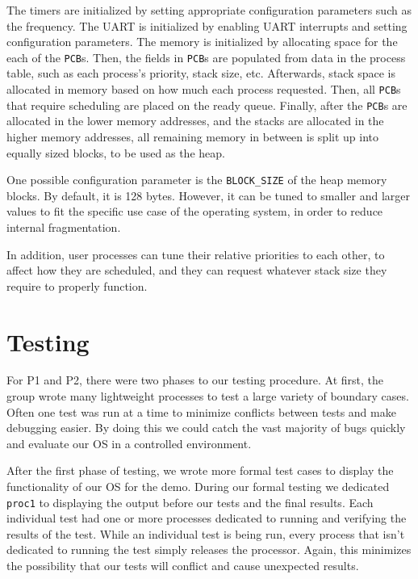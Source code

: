 \documentclass[12pt]{report}
\begin{document}
The timers are initialized by setting appropriate configuration parameters such as the frequency. The UART is initialized by enabling UART interrupts and setting configuration parameters.
The memory is initialized by allocating space for the each of the \texttt{PCB}s. Then, the fields in \texttt{PCB}s are populated from data in the process table, such as each process's priority, stack size, etc. Afterwards, stack space is allocated in memory based on how much each process requested. Then, all \texttt{PCB}s that require scheduling are placed on the ready queue. Finally, after the \texttt{PCB}s are allocated in the lower memory addresses, and the stacks are allocated in the higher memory addresses, all remaining memory in between is split up into equally sized blocks, to be used as the heap. 

One possible configuration parameter is the \texttt{BLOCK_SIZE} of the heap memory blocks. By default, it is 128 bytes. However, it can be tuned to smaller and larger values to fit the specific use case of the operating system, in order to reduce internal fragmentation.

In addition, user processes can tune their relative priorities to each other, to affect how they are scheduled, and they can request whatever stack size they require to properly function.

\section{Testing}

For P1 and P2, there were two phases to our testing procedure.  At first, the group wrote many lightweight processes to test a large variety of boundary cases.  Often one test was run at a time to minimize conflicts between tests and make debugging easier.  By doing this we could catch the vast majority of bugs quickly and evaluate our OS in a controlled environment.

After the first phase of testing, we wrote more formal test cases to display the functionality of our OS for the demo.  During our formal testing we dedicated \texttt{proc1} to displaying the output before our tests and the final results. Each individual test had one or more processes dedicated to running and verifying the results of the test.  While an individual test is being run, every process that isn't dedicated to running the test simply releases the processor.  Again, this minimizes the possibility that our tests will conflict and cause unexpected results.
\end{document}
